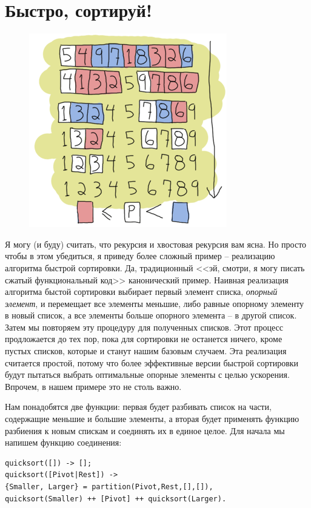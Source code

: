 \documentclass[a4paper,12pt]{report}
\begin{document}
\section{Быстро, сортируй!}
\begin{figure}
    \includegraphics[width=1\linewidth]{quicksort.png}
\end{figure}
Я могу (и буду) считать, что рекурсия и хвостовая рекурсия вам ясна. Но просто чтобы в этом убедиться, я приведу более сложный пример \--- реализацию алгоритма быстрой сортировки. Да, традиционный <<эй, смотри, я могу писать сжатый функциональный код>> канонический пример. Наивная реализация алгоритма быстой сортировки выбирает первый элемент списка, \emph{опорный элемент}, и перемещает все элементы меньшие, либо равные опорному элементу в новый список, а все элементы больше опорного элемента \--- в другой список. Затем мы повторяем эту процедуру для полученных списков. Этот процесс продложается до тех пор, пока для сортировки не останется ничего, кроме пустых списков, которые и станут нашим базовым случаем. Эта реализация считается простой, потому что более эффективные версии быстрой сортировки будут пытаться выбрать оптимальные опорные элементы с целью ускорения. Впрочем, в нашем примере это не столь важно.

Нам понадобятся две функции: первая будет разбивать список на части, содержащие меньшие и большие элементы, а вторая будет применять функцию разбиения к новым спискам и соединять их в единое целое. Для начала мы напишем функцию соединения:
\begin{lstlisting}[style=erlang]
quicksort([]) -> [];
quicksort([Pivot|Rest]) ->
{Smaller, Larger} = partition(Pivot,Rest,[],[]),
quicksort(Smaller) ++ [Pivot] ++ quicksort(Larger).
\end{lstlisting}
\end{document}
